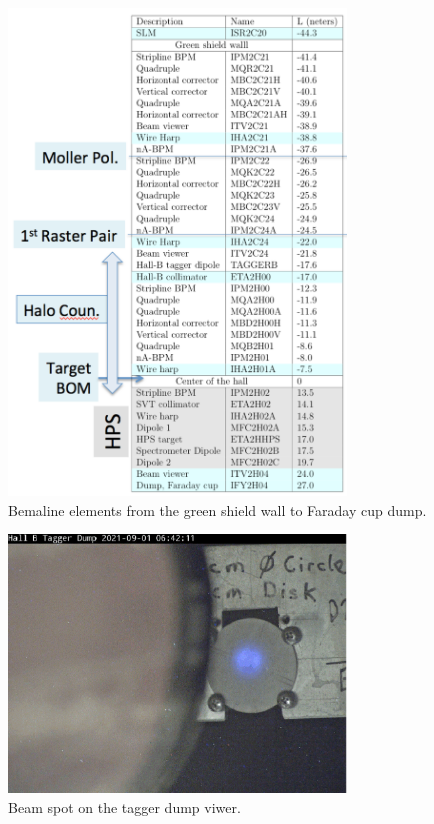 \begin{figure}[htb!]
\centering
\includegraphics[width=0.8\textwidth]{beamline_elements.pdf}
\caption{Bemaline elements from the green shield wall to Faraday cup dump.}
\label{fig:belements}
\end{figure}
\begin{figure}[htb!]
\centering
\includegraphics[width=0.8\textwidth]{Tagger_viewer.pdf}
\caption{Beam spot on the tagger dump viwer.}
\label{fig:tagger_spot}
\end{figure}



